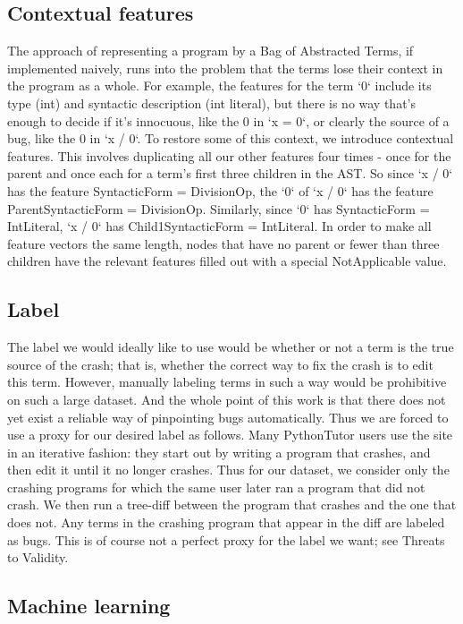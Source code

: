 \documentclass[conference]{IEEEtran}
\begin{document}
\subsection{Contextual features}

The approach of representing a program by a Bag of Abstracted Terms, if implemented
naively, runs into the problem that the terms lose their context in the program
as a whole. For example, the features for the term `0` include its type (int) and
syntactic description (int literal), but there is no way that's enough to decide
if it's innocuous, like the 0 in `x = 0`, or clearly the source of a bug, like the
0 in `x / 0`. To restore some of this context, we introduce contextual features.
This involves duplicating all our other features four times - once for the parent
and once each for a term's first three children in the AST. So since `x / 0` has
the feature SyntacticForm = DivisionOp, the `0` of `x / 0` has the feature
ParentSyntacticForm = DivisionOp. Similarly, since `0` has SyntacticForm = IntLiteral,
`x / 0` has Child1SyntacticForm = IntLiteral. In order to make all feature vectors
the same length, nodes that have no parent or fewer than three children have the
relevant features filled out with a special NotApplicable value.

\subsection{Label}

The label we would ideally like to use would be whether or not a term is the
true source of the crash; that is, whether the correct way to fix the crash is
to edit this term. However, manually labeling terms in such a way would be
prohibitive on such a large dataset. And the whole point of this work is that
there does not yet exist a reliable way of pinpointing bugs automatically. Thus
we are forced to use a proxy for our desired label as follows. Many PythonTutor
users use the site in an iterative fashion: they start out by writing
a program that crashes, and then edit it until it no longer crashes. Thus for our
dataset, we consider only the crashing programs for which the same user later
ran a program that did not crash. We then run a tree-diff \cite{tree-diff}
between the program that crashes and the one that does not. Any terms in the
crashing program that appear in the diff are labeled as bugs. This is of course
not a perfect proxy for the label we want; see Threats to Validity.

\subsection{Machine learning}
\end{document}
